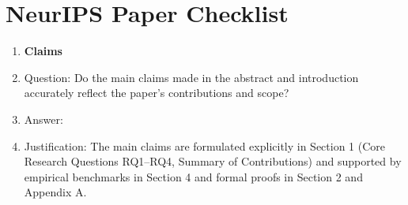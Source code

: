 \section*{NeurIPS Paper Checklist}

\begin{enumerate}

\item {\bf Claims}
    \item[] Question: Do the main claims made in the abstract and introduction accurately reflect the paper's contributions and scope?
    \item[] Answer: \answerYes{}
    \item[] Justification: The main claims are formulated explicitly in Section 1 (Core Research Questions RQ1--RQ4, Summary of Contributions) and supported by empirical benchmarks in Section 4 and formal proofs in Section 2 and Appendix A.


\end{enumerate}
